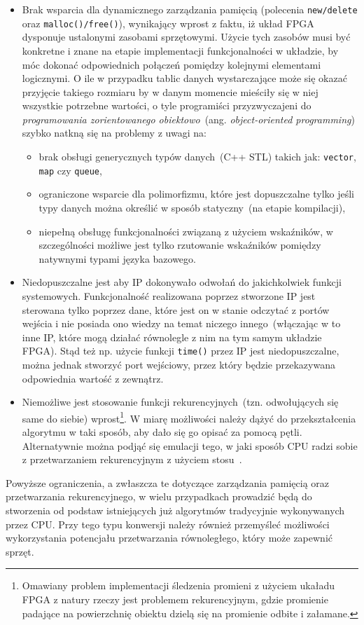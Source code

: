 \begin{itemize}
\item Brak wsparcia dla dynamicznego zarządzania pamięcią (polecenia \texttt{new/delete} oraz \texttt{malloc()/free()}), wynikający wprost z faktu, iż układ FPGA dysponuje ustalonymi zasobami sprzętowymi. Użycie tych zasobów musi być konkretne i znane na etapie implementacji funkcjonalności w układzie, by móc dokonać odpowiednich połączeń pomiędzy kolejnymi elementami logicznymi. O ile w przypadku tablic danych wystarczające może się okazać przyjęcie takiego rozmiaru by w danym momencie mieściły się w niej wszystkie potrzebne wartości, o tyle programiści przyzwyczajeni do \textit{programowania zorientowanego obiektowo}~(ang. \textit{object-oriented programming}) szybko natkną się na problemy z uwagi na:
\begin{itemize}
\item brak obsługi generycznych typów danych~(C++ STL) takich jak: \texttt{vector}, \texttt{map} czy \texttt{queue},
\item ograniczone wsparcie dla polimorfizmu, które jest dopuszczalne tylko jeśli typy danych można określić w sposób statyczny~(na etapie kompilacji),
\item niepełną obsługę funkcjonalności związaną z użyciem wskaźników, w szczególności możliwe jest tylko rzutowanie wskaźników pomiędzy natywnymi typami języka bazowego.
\end{itemize}
\item Niedopuszczalne jest aby IP dokonywało odwołań do jakichkolwiek funkcji systemowych. Funkcjonalność realizowana poprzez stworzone IP jest sterowana tylko poprzez dane, które jest on w stanie odczytać z portów wejścia i nie posiada ono wiedzy na temat niczego innego~(włączając w to inne IP, które mogą działać równolegle z nim na tym samym układzie FPGA). Stąd też np. użycie funkcji \texttt{time()} przez IP jest niedopuszczalne, można jednak stworzyć port wejściowy, przez który będzie przekazywana odpowiednia wartość z zewnątrz. 
\item Niemożliwe jest stosowanie funkcji rekurencyjnych~(tzn. odwołujących się same do siebie) wprost\footnote{Omawiany problem implementacji śledzenia promieni z użyciem ukaładu FPGA z natury rzeczy jest problemem rekurencyjnym, gdzie promienie padające na powierzchnię obiektu dzielą się na promienie odbite i załamane.}. W miarę możliwości należy dążyć do przekształcenia algorytmu w taki sposób, aby dało się go opisać za pomocą pętli. Alternatywnie można podjąć się emulacji tego, w jaki sposób CPU radzi sobie z przetwarzaniem rekurencyjnym z użyciem stosu~\cite{HLS_RECURSIVE}.
\end{itemize} 
Powyższe ograniczenia, a zwłaszcza te dotyczące zarządzania pamięcią oraz przetwarzania rekurencyjnego, w wielu przypadkach prowadzić będą do stworzenia od podstaw istniejących już algorytmów tradycyjnie wykonywanych przez CPU. Przy tego typu konwersji należy również przemyśleć możliwości wykorzystania potencjału przetwarzania równoległego, który może zapewnić sprzęt.


